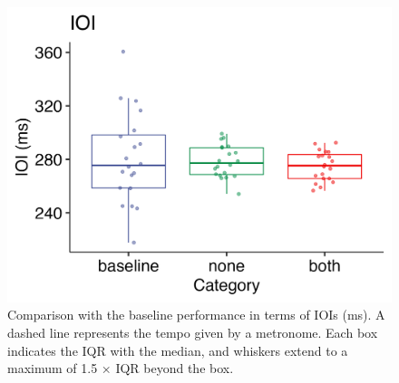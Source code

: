 \documentclass[
  man,floatsintext]{apa6}
\begin{document}
\begin{figure}
\includegraphics[width=1\linewidth]{manuscript_files/figure-latex/plot-ioi-2-1} \caption{\label{fig:ioi-2}Comparison with the baseline performance in terms of IOIs (ms). A dashed line represents the tempo given by a metronome. Each box indicates the IQR with the median, and whiskers extend to a maximum of 1.5 × IQR beyond the box.}\label{fig:plot-ioi-2}
\end{figure}
\end{document}
